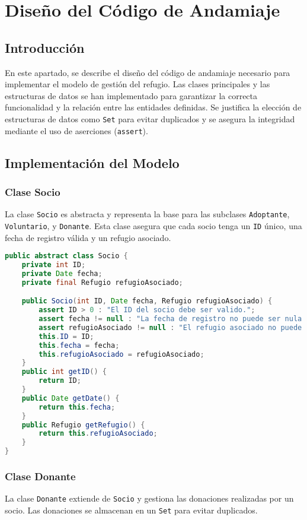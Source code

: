 \section{Diseño del Código de Andamiaje}

\subsection{Introducción}
En este apartado, se describe el diseño del código de andamiaje necesario para implementar el modelo de gestión del refugio. Las clases principales y las estructuras de datos se han implementado para garantizar la correcta funcionalidad y la relación entre las entidades definidas. Se justifica la elección de estructuras de datos como \texttt{Set} para evitar duplicados y se asegura la integridad mediante el uso de aserciones (\texttt{assert}).

\subsection{Implementación del Modelo}

\subsubsection{Clase Socio}
La clase \texttt{Socio} es abstracta y representa la base para las subclases \texttt{Adoptante}, \texttt{Voluntario}, y \texttt{Donante}. Esta clase asegura que cada socio tenga un \texttt{ID} único, una fecha de registro válida y un refugio asociado.

\begin{lstlisting}[language=Java]
public abstract class Socio {
    private int ID; 
    private Date fecha;
    private final Refugio refugioAsociado;

    public Socio(int ID, Date fecha, Refugio refugioAsociado) {
        assert ID > 0 : "El ID del socio debe ser valido.";
        assert fecha != null : "La fecha de registro no puede ser nula.";
        assert refugioAsociado != null : "El refugio asociado no puede ser nulo.";
        this.ID = ID;
        this.fecha = fecha;
        this.refugioAsociado = refugioAsociado;
    }
    public int getID() {
        return ID;
    }
    public Date getDate() {
        return this.fecha;
    }
    public Refugio getRefugio() {
        return this.refugioAsociado;
    }
}
\end{lstlisting}

\subsubsection{Clase Donante}
La clase \texttt{Donante} extiende de \texttt{Socio} y gestiona las donaciones realizadas por un socio. Las donaciones se almacenan en un \texttt{Set} para evitar duplicados.

